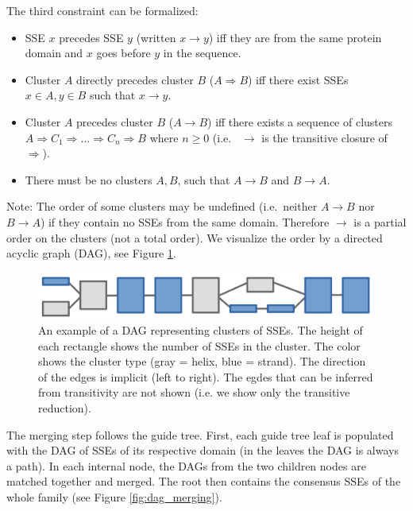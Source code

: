 \documentclass{article}
\begin{document}
The third constraint can be formalized:

\begin{itemize}
\item
  SSE \(x\) precedes SSE \(y\) (written \(x \rightarrow y\)) iff they
  are from the same protein domain and \(x\) goes before \(y\) in the sequence.
\item
  Cluster \(A\) directly precedes cluster \(B\) (\(A \Rightarrow B\)) iff there
  exist SSEs \(x \in A, y \in B\) such that \(x \rightarrow y\).
\item
  Cluster \(A\) precedes cluster \(B\) (\(A \rightarrow B\)) iff there
  exists a sequence of clusters \(A \Rightarrow C_1 \Rightarrow ... 
  \Rightarrow C_n \Rightarrow B\) where \(n \geq 0\) (i.e.~ \(\rightarrow\) 
  is the transitive closure of \(\Rightarrow\)).
\item
  There must be no clusters \(A, B\), such that
  \(A \rightarrow B\) and \(B \rightarrow A\).
\end{itemize}

Note: The order of some clusters may be undefined (i.e.~neither 
\(A \rightarrow B\) nor \(B \rightarrow A\)) if they contain no SSEs 
from the same domain. Therefore \(\rightarrow\) is a partial order on the clusters (not a total order).
We visualize the order by a directed acyclic graph (DAG), see Figure \ref{fig:dag_example}.

\begin{figure}[h!]
  \centering\includegraphics[width=0.6\linewidth]{figures/dag_ABCDE.png}
  \caption{An example of a DAG representing clusters of SSEs. 
  The height of each rectangle shows the number of SSEs in the cluster.
  The color shows the cluster type (gray = helix, blue = strand).
  The direction of the edges is implicit (left to right).
  The egdes that can be inferred from transitivity are not shown 
  (i.e. we show only the transitive reduction). }
  \label{fig:dag_example}
\end{figure}

The merging step follows the guide tree. First, each guide tree leaf is
populated with the DAG of SSEs of its respective domain (in the leaves the DAG is always a path). 
In each internal node, the DAGs from the two children nodes are matched together and merged. 
The root then contains the consensus SSEs of the whole family (see Figure \ref{fig:dag_merging}). 
\end{document}
